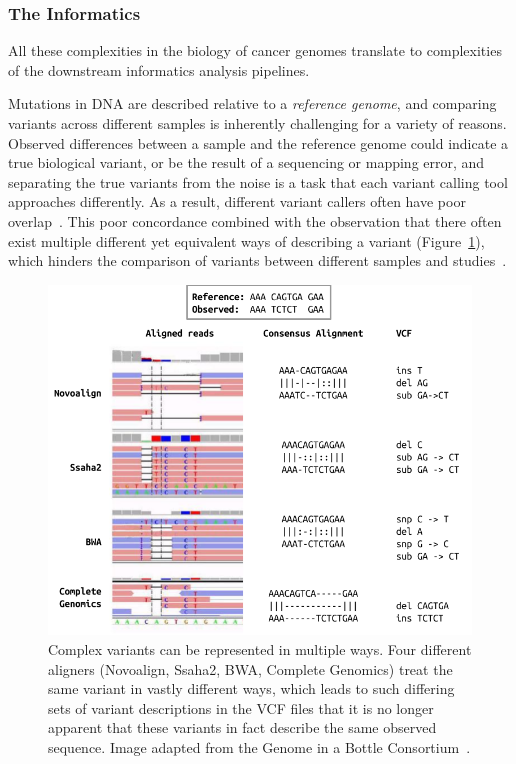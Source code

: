 \begin{justify}
\subsubsection{The Informatics}

All these complexities in the biology of cancer genomes translate to complexities of the downstream informatics analysis pipelines.

Mutations in DNA are described relative to a \emph{reference genome}, and comparing variants across different samples is inherently challenging for a variety of reasons. Observed differences between a sample and the reference genome could indicate a true biological variant, or be the result of a sequencing or mapping error, and separating the true variants from the noise is a task that each variant calling tool approaches differently. As a result, different variant callers often have poor overlap~\cite{orawe2013, hwang2015systematic}. This poor concordance combined with the observation that there often exist multiple different yet equivalent ways of describing a variant (Figure~\ref{fig:variant-multiple-representations}), which hinders the comparison of variants between different samples and studies~\cite{zook2014integrating}.

\begin{figure}[h!]
    \centering
    \includegraphics[width=400pt]{chapters/images/variant-representation-all.png}

    \caption{Complex variants can be represented in multiple ways. Four different aligners (Novoalign, Ssaha2, BWA, Complete Genomics) treat the same variant in vastly different ways, which leads to such differing sets of variant descriptions in the VCF files that it is no longer apparent that these variants in fact describe the same observed sequence. Image adapted from the Genome in a Bottle Consortium~\cite{zook2014integrating}.}
    \label{fig:variant-multiple-representations}
\end{figure}



\end{justify}
